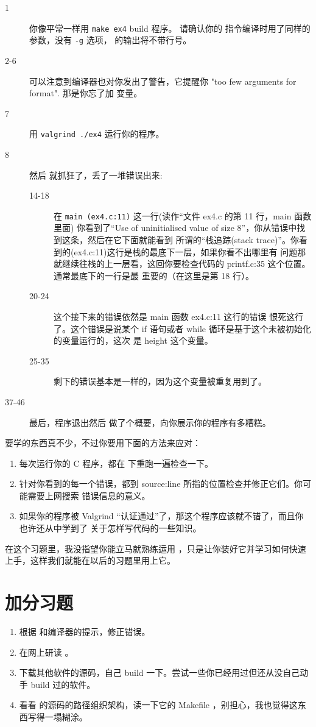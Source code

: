 \begin{description}
\item[1] 你像平常一样用 \verb|make ex4| build 程序。 请确认你的  指令编译时用了同样的参数，没有 \verb|-g| 选项， 的输出将不带行号。
\item[2-6] 可以注意到编译器也对你发出了警告，它提醒你 "too few arguments for format". 那是你忘了加  变量。
\item[7] 用 \verb|valgrind ./ex4| 运行你的程序。
\item[8] 然后  就抓狂了，丢了一堆错误出来:
    \begin{description}
        \item[14-18] 在 \verb|main (ex4.c:11)| 这一行(读作“文件 ex4.c 的第 11 行，main 函数里面)
            你看到了“Use of uninitialised value of size 8”，你从错误中找到这条，然后在它下面就能看到
            所谓的“栈追踪(stack trace)”。你看到的(ex4.c:11)这行是栈的最底下一层，如果你看不出哪里有
            问题那就继续往栈的上一层看，这回你要检查代码的 printf.c:35 这个位置。通常最底下的一行是最
            重要的（在这里是第 18 行）。
        \item[20-24] 这个接下来的错误依然是 main 函数 ex4.c:11 这行的错误 
            恨死这行了。这个错误是说某个 if 语句或者 while 循环是基于这个未被初始化的变量运行的，这次
            是 height 这个变量。
        \item[25-35] 剩下的错误基本是一样的，因为这个变量被重复用到了。
    \end{description}
\item[37-46] 最后，程序退出然后  做了个概要，向你展示你的程序有多糟糕。
\end{description}

要学的东西真不少，不过你要用下面的方法来应对：

\begin{enumerate}
\item 每次运行你的 C 程序，都在  下重跑一遍检查一下。
\item 针对你看到的每一个错误，都到 source:line 所指的位置检查并修正它们。你可能需要上网搜索
    错误信息的意义。
\item 如果你的程序被 Valgrind “认证通过”了，那这个程序应该就不错了，而且你也许还从中学到了
    关于怎样写代码的一些知识。
\end{enumerate}

在这个习题里，我没指望你能立马就熟练运用  ，只是让你装好它并学习如何快速上手，这样我们就能在以后的习题里用上它。

\section{加分习题}

\begin{enumerate}
\item 根据  和编译器的提示，修正错误。
\item 在网上研读  。
\item 下载其他软件的源码，自己 build 一下。尝试一些你已经用过但还从没自己动手 build 过的软件。
\item 看看  的源码的路径组织架构，读一下它的 Makefile ，别担心，我也觉得这东西写得一塌糊涂。
\end{enumerate}

